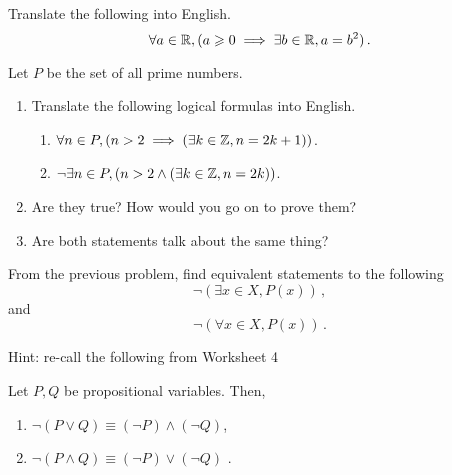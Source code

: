 \documentclass[12pt]{amsart}
\begin{document}
\begin{problem}
    Translate the following into English.
    \begin{equation*}
        \forall a \in \mathbb{R}, (a \geqslant 0 \implies \exists b \in \mathbb{R}, a=b^2) \,.
    \end{equation*}
\end{problem}

\begin{problem}
    Let $P$ be the set of all prime numbers.
    \begin{enumerate}
        \item Translate the following logical formulas into English.
   \begin{enumerate}
       \item $\forall n \in P, (n> 2 \implies (\exists k \in \mathbb{Z}, n = 2k+ 1))$.
       \item $\neg \exists n \in P, (n> 2 \wedge ( \exists k \in \mathbb{Z}, n = 2k))$.
   \end{enumerate}
\item Are they true? How would you go on to prove them?
\item Are both statements talk about the same thing?
    \end{enumerate}
\end{problem}

\begin{problem}
    From the previous problem,
    find equivalent statements to the following
    \begin{equation*}
       \neg (\exists x \in X, P(x)) \,,
    \end{equation*}
and
    \begin{equation*}
       \neg ( \forall x \in X, P(x)) \,.
    \end{equation*}
\end{problem}

Hint: re-call the following from Worksheet 4
\begin{theorem}
   Let $P, Q$ be propositional variables. Then,
   \begin{enumerate}
       \item $\neg (P \vee Q) \equiv (\neg P) \wedge (\neg Q) $,
       \item $\neg (P \wedge Q) \equiv (\neg P) \vee (\neg Q) $ .
   \end{enumerate}
\end{theorem}
\end{document}
